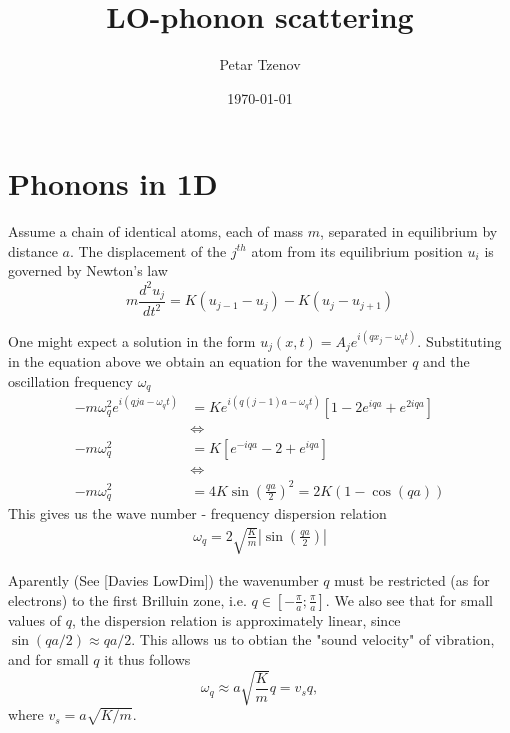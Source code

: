 \documentclass[10pt,twoside, a4paper]{article}
\begin{document}
\title{LO-phonon scattering}
\author{Petar Tzenov}
\date{\today}
\maketitle
\section{Phonons in 1D}

Assume a chain of identical atoms, each of mass $m$, separated in equilibrium by distance  $a$. The displacement 
of the $j^{th}$ atom from its equilibrium position $u_i$ is governed by Newton's law 
\begin{equation}
m \frac{d^2 u_j}{dt^2} = K(u_{j-1}-u_{j}) - K(u_{j}-u_{j+1})
\end{equation}


One might expect a solution in the form $u_j(x,t) = A_j e^{i(q x_j - \omega_q t)}$. Substituting in the equation above we 
obtain an equation for the wavenumber  $q$ and the oscillation frequency $\omega_q$
\begin{align}
- m \omega_q^2 e^{i(q ja - \omega_q t)} &= K e^{i(q (j-1) a-\omega_q t)} [1-2e^{iqa} + e^{2iqa}] \\
&\Leftrightarrow \nonumber \\
-m \omega_q^2 &= K [e^{-iqa}-2 + e^{iqa}] \\
&\Leftrightarrow \nonumber \\
-m \omega_q^2 &= 4K \sin(\frac{qa}{2})^2 = 2K(1-\cos(qa))
\end{align}
This gives us the wave number - frequency dispersion relation 
\begin{align}
\label{eq:atomic_chain_disprel}
\omega_q = 2 \sqrt{\frac{K}{m}} |\sin(\frac{qa}{2})|
\end{align}

Aparently (See [Davies LowDim]) the wavenumber $q$ must be restricted (as for electrons) to the first Brilluin zone,
i.e. $q\in[-\frac{\pi}{a};\frac{\pi}{a}]$. We also see that for small values of $q$, the dispersion relation is approximately linear, since 
$\sin(qa/2) \approx qa/2$. This allows us to obtian the "sound velocity" of vibration, and for small $q$ it thus follows
\begin{equation}
\omega_q \approx a\sqrt{\frac{K}{m}} q = v_s q,
\end{equation} 
where $v_s = a\sqrt{K/m}$.



\end{document}
